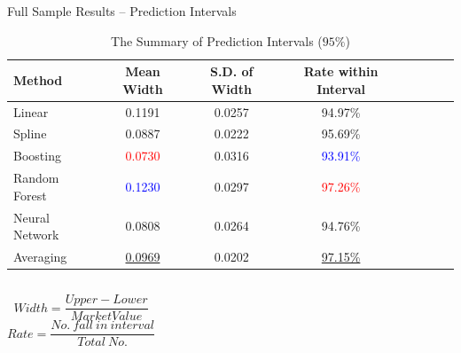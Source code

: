 \documentclass{beamer}
\begin{document}
\begin{frame}[t]{Full Sample Results -- Prediction Intervals}

\begin{table}
\caption{The Summary of Prediction Intervals ($95\%$)}
\vspace*{-\baselineskip}
\begin{tabular}{lccccccc}
Method &Mean Width &S.D. of Width &Rate within Interval\\
\hline
Linear         &0.1191 &0.0257 &94.97\%\\
Spline         &0.0887 &0.0222 &95.69\%\\
Boosting       &\textcolor{red}{0.0730} &0.0316 &\textcolor{blue}{93.91\%}\\
Random Forest  &\textcolor{blue}{0.1230} &0.0297 &\textcolor{red}{97.26\%}\\
Neural Network &0.0808 &0.0264 &94.76\%\\
Averaging      &\underline{0.0969} &0.0202 &\underline{97.15\%}\\
\end{tabular}
\end{table}

\begin{columns}[onlytextwidth]
\begin{equation}
Width = \frac{Upper - Lower}{Market Value}
\end{equation}
\begin{equation}
Rate = \frac{No.~fall~in~interval}{Total~No.}
\end{equation}
\end{columns}
\end{frame}
\end{document}
